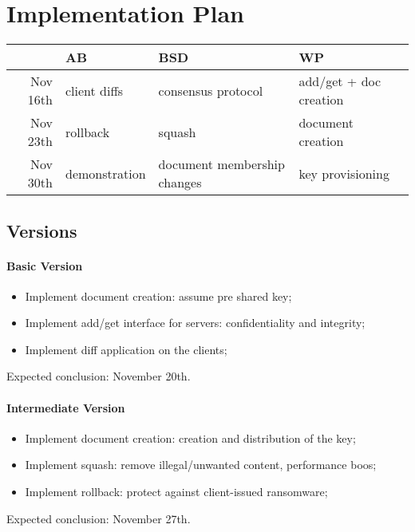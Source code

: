 \section{Implementation Plan}

\begin{table*}[ht]
    \centering
    \label{Effort Commitment}
    \begin{tabular}{r|l|l|l}
        & AB & BSD & WP \\
        \hline
        Nov 16th & client diffs & consensus protocol & add/get + doc creation \\
        Nov 23th & rollback & squash & document creation \\
        Nov 30th & demonstration & document membership changes & key provisioning\\
    \end{tabular}
\end{table*}

\subsection{Versions}

\paragraph{Basic Version} {
    \begin{itemize}
        \setlength{\itemsep}{0pt}
        \setlength{\parskip}{0pt}
        \setlength{\parsep}{0pt}
        \item Implement document creation: assume pre shared key;
        \item Implement add/get interface for servers: confidentiality and integrity;
        \item Implement diff application on the clients;
    \end{itemize}
    Expected conclusion: November 20th.
}

\paragraph{Intermediate Version} {
    \begin{itemize}
        \setlength{\itemsep}{0pt}
        \setlength{\parskip}{0pt}
        \setlength{\parsep}{0pt}
        \item Implement document creation: creation and distribution of the key;
        \item Implement squash: remove illegal/unwanted content, performance boos;
        \item Implement rollback: protect against client-issued ransomware;
    \end{itemize}
    Expected conclusion: November 27th.
}


